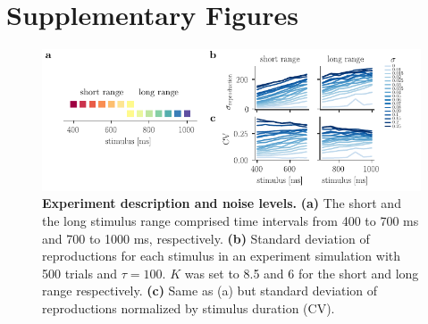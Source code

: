 \documentclass[10pt]{article}
\begin{document}
\section{Supplementary Figures}
\begin{figure}[!htb]
	\centering
	\includegraphics{figures/supp_CV.pdf}
	\caption{\textbf{Experiment description and noise levels.} 
	\textbf{(a)} The short and the long stimulus range comprised time intervals from 400 to 700 ms and 700 to 1000 ms, respectively.
	\textbf{(b)} Standard deviation of reproductions for each stimulus in an experiment simulation with 500 trials and $\tau=100$. $K$ was set to 8.5 and 6 for the short and long range respectively. 
	\textbf{(c)} Same as (a) but standard deviation of reproductions normalized by stimulus duration (CV).
	}
\label{sup:CV}
\end{figure}
\end{document}
